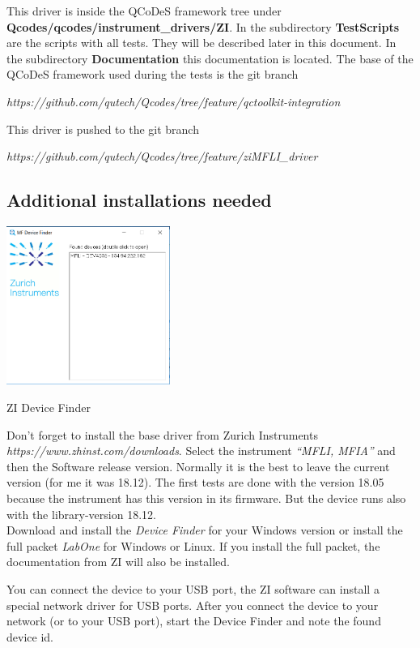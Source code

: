 \documentclass[11pt]{article} %
\begin{document}
This driver is inside the QCoDeS framework tree under {\bf Qcodes/qcodes/instrument\_drivers/ZI}. In the subdirectory {\bf TestScripts} are the scripts with all tests. They will be described later in this document. In the subdirectory {\bf Documentation} this documentation is located. The base of the QCoDeS framework used during the tests is the git branch \\
\centerline{\it https://github.com/qutech/Qcodes/tree/feature/qctoolkit-integration}
This driver is pushed to the git branch \\
\centerline{\it https://github.com/qutech/Qcodes/tree/feature/ziMFLI\_driver}


\subsection{Additional installations needed}

\begin{floatingfigure}[r]{0.42\textwidth}
\mbox{\includegraphics[width=0.4\textwidth]{ZI-DeviceFinder.png}}
\caption{ZI Device Finder}
\end{floatingfigure}
Don't forget to install the base driver from Zurich Instruments {\it https://www.zhinst.com/downloads}. Select the instrument {\it ``MFLI, MFIA''} and then the Software release version. Normally it is the best to leave the current version (for me it was 18.12). The first tests are done with the version 18.05 because the instrument has this version in its firmware. But the device runs also with the library-version 18.12. \\
Download and install the {\it Device Finder} for your Windows version or install the full packet {\it LabOne} for Windows or Linux. If you install the full packet, the documentation from ZI will also be installed.

You can connect the device to your USB port, the ZI software can install a special network driver for USB ports. After you connect the device to your network (or to your USB port), start the Device Finder and note the found device id.
\end{document}
